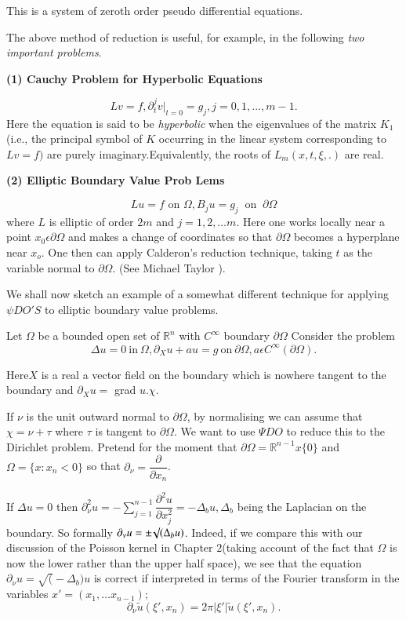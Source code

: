 This is a system of zeroth order pseudo differential equations.

The above method of reduction is useful, for example, in the following
\textit{two important problems}.  

\medskip
\textbf{(1) Cauchy Problem for Hyperbolic Equations}

$$
Lv= f,   \partial_t^{j}v |_{t=0} = g_j,  j = 0,  1, \ldots,  m-1.
$$
Here the equation is said to be \textit{hyperbolic} when the
eigenvalues of the matrix $K_1$ (i.e., the principal symbol of $K$
occurring in the linear system corresponding to $Lv =f )$ are purely
imaginary.Equivalently, the roots of  $L_m (x, t, \xi,.)$ are real. 

\medskip
\textbf{(2) Elliptic Boundary Value Prob Lems}

$$
Lu = f \text{ on } \Omega, B_j u = g_j ~\text{ on }~ \partial \Omega
$$
where $L$ is elliptic of order $2m$ and $j= 1, 2, \ldots m$. Here one
works  locally near a point $x_0 \epsilon \partial \Omega$ and
makes a change of coordinates so that $ \partial \Omega$ becomes a
hyperplane near $x_o$. One  then can apply Calderon's reduction
technique, taking $t$ as  the variable normal to $ \partial \Omega$.
(See Michael Taylor \cite{3}). 

We shall now sketch an  example  of a somewhat different technique for
applying  $\psi DO'S$  to elliptic boundary  value problems. 

Let $\Omega$ be a bounded open set of $ \mathbb{R}^n$ with $C^
{\infty}$ boundary $ \partial \Omega$ Consider the problem 
$$
\Delta u = 0 ~\text{in}~ \Omega,  \partial_X u + au = g ~\text{on}~
\partial \Omega, a \epsilon C^ \infty (\partial \Omega). 
$$

Here\pageoriginale $X$ is a real a vector field on the boundary which is nowhere
tangent to the boundary and $\partial _X u = $ grad $u.\chi$. 

If $\nu$ is the unit outward normal to $\partial \Omega $, by
normalising we can assume  that $\chi = \nu  + \tau $ where $\tau$ is
tangent to $\partial \Omega$.  We want to use $ \Psi DO$ to  reduce
this to the Dirichlet problem. Pretend for the  moment that $\partial
\Omega = \mathbb{R}^{n-1}x \{ 0\}$ and $ \Omega = \{ x : x_n < 0\} $
so that $\partial _\nu = \dfrac{\partial}{ \partial x_n}$. 

If $ \Delta u = 0$ then $\partial _\nu ^2 u = - \sum \limits
_{j=1}^{n-1} \dfrac{\partial ^2 u}{\partial x_j ^2}= - \Delta _b u, 
\Delta_b $ being the  Laplacian on the boundary. So formally $
\partial _\nu u  = \pm  \surd(\- \Delta_b u)$. Indeed, if we compare
this with our discussion of the Poisson kernel in Chapter $2$(taking
account of the fact that $\Omega$  is now the lower rather than the
upper half  space), we see that the equation $\partial _ \nu u = \surd
(-\Delta_b ) u $ is correct if interpreted in terms of the Fourier
transform in the variables $ x' = (x_1,  \ldots x_{n-1});$ 
$$
\partial_ \nu \tilde{u} ( \xi ',  x_n) = 2 \pi | \xi ' | \tilde{u} (
\xi ',  x_n ). 
$$

